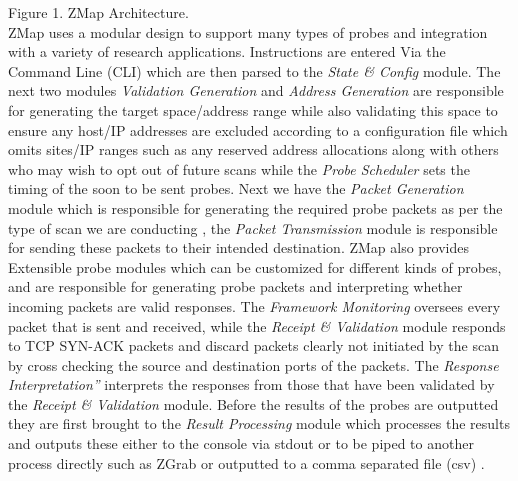 \documentclass[a4wide,leqno,12pt]{report}
\begin{document}
Figure 1. ZMap Architecture.\\


ZMap uses a modular design to support many types of probes and integration with a variety of research applications. Instructions are entered Via the Command Line (CLI) which are then parsed to the \textit{State \& Config} module. The next two modules \textit{Validation Generation} and
\textit{Address Generation} are responsible for generating the target space/address range while also validating this space to ensure any host/IP addresses are excluded according to a configuration file which omits sites/IP ranges such as any reserved address allocations along with others who may wish to opt out of future scans \cite{durumeric2013zmap} while the \textit{Probe Scheduler} sets the timing of the soon to be sent probes. Next we have the \textit{Packet Generation} module which is responsible for generating the required probe packets as per the type of scan we are conducting , the \textit{Packet Transmission} module is responsible for sending these packets to their intended destination. ZMap also provides Extensible probe modules which can be customized for different kinds of probes, and are responsible for generating probe packets and interpreting whether incoming packets are valid responses. The \textit{Framework Monitoring} oversees every packet that is sent and received, while the \textit{Receipt \& Validation} module responds to TCP SYN-ACK packets and discard packets clearly not initiated by the scan by cross checking the source and destination ports of the packets. The \textit{Response Interpretation”} interprets the responses from those that have been validated by the \textit{Receipt \& Validation} module. Before the results of the probes are outputted they are first brought to the \textit{Result Processing} module which processes the results and outputs these either to the console via stdout or to be piped to another process directly such as ZGrab or outputted to a comma separated file (csv) \cite{durumeric2013zmap}.\\
\end{document}
